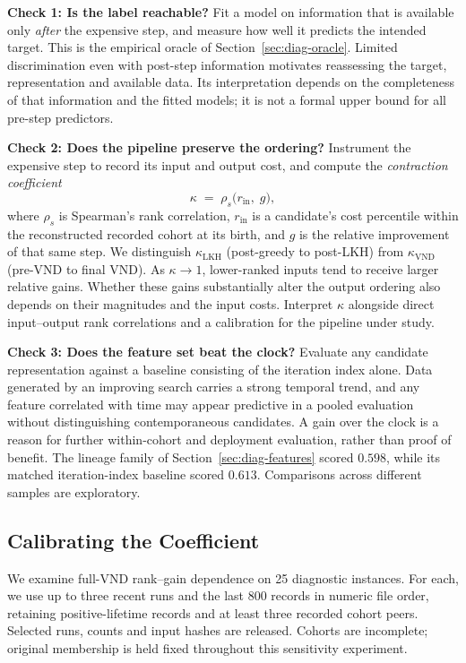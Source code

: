 \documentclass[a4paper,fleqn]{cas-dc}
\begin{document}
\textbf{Check 1: Is the label reachable?} Fit a model on information that is
available only \emph{after} the expensive step, and measure how well it predicts
the intended target. This is the empirical oracle of
Section~\ref{sec:diag-oracle}. Limited discrimination even with post-step
information motivates reassessing the target, representation and available data.
Its interpretation depends on the completeness of that information and the
fitted models; it is not a formal upper bound for all pre-step predictors.

\textbf{Check 2: Does the pipeline preserve the ordering?} Instrument the
expensive step to record its input and output cost, and compute the
\emph{contraction coefficient}
\begin{equation}
\kappa \;=\; \rho_{s}\bigl(r_{\text{in}},\; g\bigr),
\label{eq:kappa}
\end{equation}
where $\rho_s$ is Spearman's rank correlation, $r_{\text{in}}$ is a candidate's
cost percentile within the reconstructed recorded cohort at its birth,
and $g$ is the relative improvement of that same step. We distinguish
$\kappa_{\mathrm{LKH}}$ (post-greedy to post-LKH) from
$\kappa_{\mathrm{VND}}$ (pre-VND to final VND). As $\kappa \to 1$,
lower-ranked inputs tend to receive larger relative gains. Whether these gains
substantially alter the output ordering also depends on their magnitudes and
the input costs. Interpret $\kappa$ alongside direct input--output rank
correlations and a calibration for the pipeline under study.

\textbf{Check 3: Does the feature set beat the clock?} Evaluate any candidate
representation against a baseline consisting of the iteration index alone. Data
generated by an improving search carries a strong temporal trend, and any feature
correlated with time may appear predictive in a pooled evaluation without
distinguishing contemporaneous candidates. A gain over the clock is a reason for
further within-cohort and deployment evaluation, rather than proof of benefit.
The lineage family of
Section~\ref{sec:diag-features} scored $0.598$, while its matched iteration-index
baseline scored $0.613$. Comparisons across different samples are exploratory.

\subsection{Calibrating the Coefficient}\label{sec:gate-curve}

We examine full-VND rank--gain dependence on 25 diagnostic instances. For each,
we use up to three recent runs and the last 800 records in numeric file order,
retaining positive-lifetime records and at least three recorded cohort peers.
Selected runs, counts and input hashes are released. Cohorts are incomplete;
original membership is held fixed throughout this sensitivity experiment.
\end{document}
